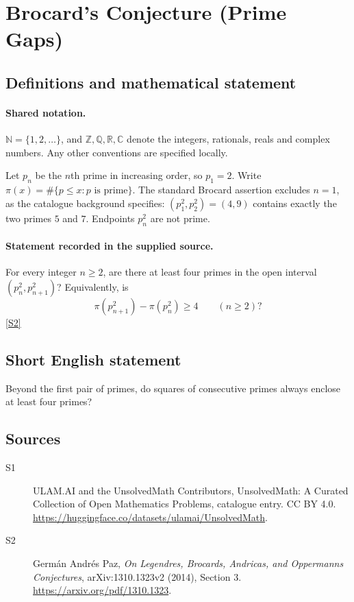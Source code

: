 \documentclass[11pt]{article}
\newcommand{\sref}[2]{\hyperlink{source:#1:#2}{[S#2]}}
\begin{document}
\section{Brocard's Conjecture (Prime Gaps)}\label{statement}

\subsection{Definitions and mathematical statement}

\paragraph{Shared notation.}$\mathbb N=\{1,2,\ldots\}$, and $\mathbb Z,\mathbb Q,\mathbb R,\mathbb C$ denote the integers, rationals, reals and complex numbers. Any other conventions are specified locally.


Let $p_n$ be the $n$th prime in increasing order, so $p_1=2$. Write $\pi(x)=\#\{p\leq x:p\text{ is prime}\}$. The standard Brocard assertion excludes $n=1$, as the catalogue background specifies: $(p_1^2,p_2^2)=(4,9)$ contains exactly the two primes $5$ and $7$. Endpoints $p_n^2$ are not prime.
\paragraph{Statement recorded in the supplied source.}
For every integer $n\geq2$, are there at least four primes in the open interval $(p_n^2,p_{n+1}^2)$? Equivalently, is
\[
\pi(p_{n+1}^2)-\pi(p_n^2)\geq4\qquad(n\geq2)?
\] \sref{statement}{2}

\subsection{Short English statement}
Beyond the first pair of primes, do squares of consecutive primes always enclose at least four primes?
\subsection{Sources}
\begin{description}
\item[\hypertarget{source:statement:1}{S1}] ULAM.AI and the UnsolvedMath Contributors, UnsolvedMath: A Curated Collection of Open Mathematics Problems, catalogue entry. CC BY 4.0. \url{https://huggingface.co/datasets/ulamai/UnsolvedMath}.
\item[\hypertarget{source:statement:2}{S2}] Germ\'{a}n Andr\'{e}s Paz, \emph{On Legendre\textquotesingle s, Brocard\textquotesingle s, Andrica\textquotesingle s, and Oppermann\textquotesingle s Conjectures}, arXiv:1310.1323v2 (2014), Section 3. \url{https://arxiv.org/pdf/1310.1323}.
\end{description}
\label{end:statement}
\end{document}
